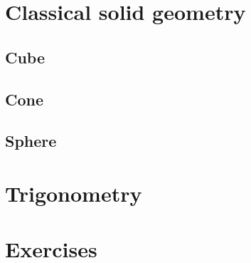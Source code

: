 

\section{Classical solid geometry}
\subsection{Cube}
\subsection{Cone}
\subsection{Sphere}

\section{Trigonometry}

\section{Exercises}
\begin{ExerciseList}


\end{ExerciseList}
